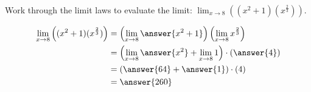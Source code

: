 \documentclass{ximera}
\author{Steven Gubkin \and Bobby Ramsey}
\begin{document}
\begin{exercise}

	Work through the limit laws to evaluate the limit: $\displaystyle \lim_{x \to 8} \left( (x^2+1)(x^{\frac{2}{3}}) \right)$.

	\begin{align*}
		\lim_{x \to 8} \left( (x^2+1)(x^{\frac{2}{3}}) \right) &= \left(\lim_{x\to 8} \answer{x^2+1}\right) \left( \lim_{x\to 8} x^{\frac{2}{3}}\right)\\
			&= \left( \lim_{x\to 8} \answer{x^2} + \lim_{x\to 8} 1 \right) \cdot \left( \answer{4} \right) \\
			&= \left( \answer{64} + \answer{1} \right) \cdot \left(4\right)\\
			&= \answer{260}
	\end{align*}
	
\end{exercise}
\end{document}
